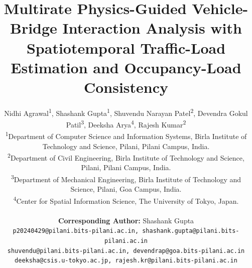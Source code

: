 \documentclass[journal]{IEEEtran}
\begin{document}
\flushbottom
   
\title{Multirate Physics-Guided Vehicle-Bridge Interaction Analysis with Spatiotemporal Traffic-Load Estimation and Occupancy-Load Consistency}


\author{\footnotesize
    Nidhi Agrawal\textsuperscript{1},
    Shashank Gupta\textsuperscript{1},
    Shuvendu Narayan Patel\textsuperscript{2},
    Devendra Gokul Patil\textsuperscript{3},
    Deeksha Arya\textsuperscript{4},
    Rajesh Kumar\textsuperscript{2}

    {\small
    \textsuperscript{1}Department of Computer Science and Information Systems, Birla Institute of Technology and Science, Pilani, Pilani Campus, India. \\
    \textsuperscript{2}Department of Civil Engineering, Birla Institute of Technology and Science, Pilani, Pilani Campus, India. \\
    \textsuperscript{3}Department of Mechanical Engineering, Birla Institute of Technology and Science, Pilani, Goa Campus, India. \\
    \textsuperscript{4}Center for Spatial Information Science, The University of Tokyo, Japan. \\
    }

    {\scriptsize \textbf{Corresponding Author:} Shashank Gupta} \\[0.ex]
    \scriptsize
    \texttt{p20240429@pilani.bits-pilani.ac.in, shashank.gupta@pilani.bits-pilani.ac.in} \\
    \texttt{shuvendu@pilani.bits-pilani.ac.in, devendrap@goa.bits-pilani.ac.in} \\
    \texttt{deeksha@csis.u-tokyo.ac.jp, rajesh.kr@pilani.bits-pilani.ac.in}
}


\maketitle
\end{document}
